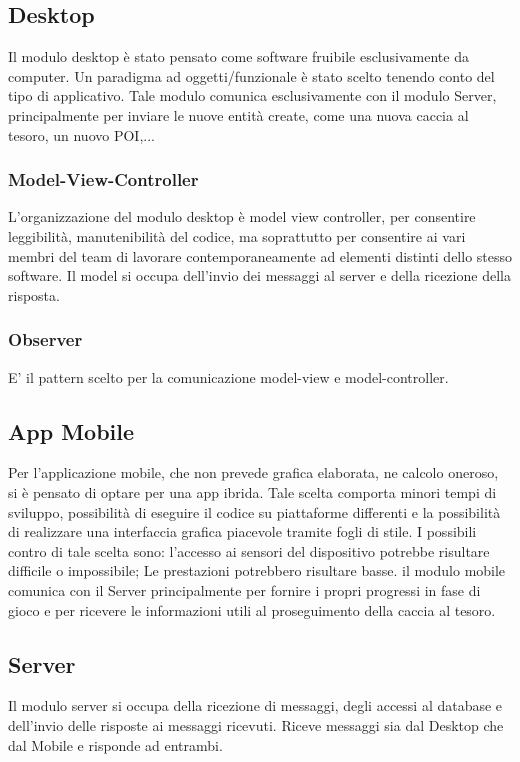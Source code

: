 \documentclass[12pt, italian]{article}
\begin{document}
\subsection{Desktop}
Il modulo desktop è stato pensato come software fruibile esclusivamente da computer. Un paradigma ad oggetti/funzionale è stato scelto tenendo conto del tipo di applicativo. Tale modulo  comunica esclusivamente con il modulo Server, principalmente per inviare le nuove entità create, come una nuova caccia al tesoro, un nuovo POI,...
\subsubsection{Model-View-Controller}
L'organizzazione del modulo desktop è model view controller, per consentire leggibilità, manutenibilità del codice, ma soprattutto per consentire ai vari membri del team di lavorare contemporaneamente ad elementi distinti dello stesso software.
Il model si occupa dell'invio dei messaggi al server e della ricezione della risposta.
\subsubsection*{Observer}
E' il pattern scelto per la comunicazione model-view e model-controller.

\subsection{App Mobile}
Per l'applicazione mobile, che non prevede grafica elaborata, ne calcolo oneroso, si è pensato di optare per una app ibrida.
Tale scelta comporta minori tempi di sviluppo, possibilità di eseguire il codice su piattaforme differenti e la possibilità di realizzare una interfaccia grafica piacevole tramite fogli di stile.
I possibili contro di tale scelta sono: l'accesso ai sensori del dispositivo potrebbe risultare difficile o impossibile; Le prestazioni potrebbero risultare basse.
il modulo mobile comunica con il Server principalmente per fornire i propri progressi in fase di gioco e per ricevere le informazioni utili al proseguimento della caccia al tesoro.

\subsection{Server}
Il modulo server si occupa della ricezione di messaggi, degli accessi al database e dell'invio delle risposte ai messaggi ricevuti. Riceve messaggi sia dal Desktop che dal Mobile e risponde ad entrambi.
\end{document}
